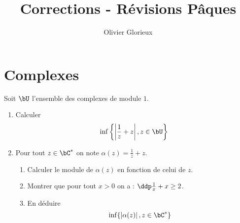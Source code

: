 \documentclass[a4paper, 11pt,reqno]{article}
\author{Olivier Glorieux}
\begin{document}
\title{Corrections - Révisions Pâques
}

\section{Complexes}









\begin{exercice}
Soit $\bU$ l'ensemble des complexes de module $1$. 
\begin{enumerate}
\item Calculer 
$$\inf \left\{ \left| \frac{1}{z}+z\right| , z \in \bU\right\}$$

\item Pour tout $z\in \bC^*$ on note  $\alpha(z)= \frac{1}{\bar{z}}+z$. 
\begin{enumerate}
\item Calculer le module de $\alpha(z)$ en fonction de celui de $z$. 
\item Montrer que pour tout $x>0$ on a : $\ddp \frac{1}{x}+x\geq 2$.
\item En déduire 
$$\inf\{ \left| \alpha(z)\right| , z \in \bC^*\}$$
\end{enumerate}
\end{enumerate}
\end{exercice}
\end{document}
